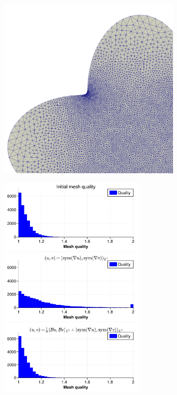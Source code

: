 \documentclass[aspectratio=1610]{beamer}
\begin{document}
\begin{frame}
    \begin{center}
        \includegraphics[width=0.67\textwidth]{./img/levelset/CR_sym_grad_1e-2_mesh.png}
    \end{center}
\end{frame}\begin{frame}
    \vspace{1em}
    \begin{adjustwidth}{-4em}{-4em}
        \begin{center}
            \includegraphics[width=0.54\textwidth]{./img/levelset/CR_grad_1e_2_mesh_quality_initial.png}\\
            \includegraphics[width=0.54\textwidth]{./img/levelset/sym_grad_mesh_quality_final.png}
            \includegraphics[width=0.54\textwidth]{./img/levelset/CR_sym_grad_1e-2_mesh_quality_final.png}

\end{center}
\end{adjustwidth}
\end{frame}
\end{document}
